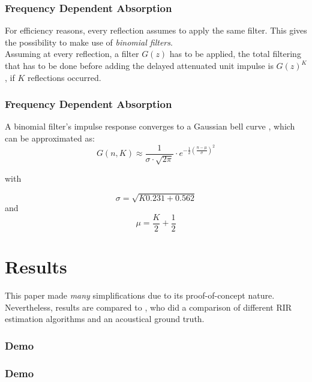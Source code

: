 \documentclass[aspectratio=169]{beamer}
\begin{document}
\begin{frame}
\frametitle{Frequency Dependent Absorption}
For efficiency reasons, every reflection assumes to apply the same filter. This gives the possibility to make use of \textit{binomial filters}. \\
Assuming at every reflection, a filter $G(z)$ has to be applied, the total filtering that has to be done before adding the delayed attenuated unit impulse is $G(z)^K$, if $K$ reflections occurred.


\end{frame}

\begin{frame}
\frametitle{Frequency Dependent Absorption}
A binomial filter's impulse response converges to a Gaussian bell curve \cite{aubury_binomial_1996}, which can be approximated as:
\begin{equation}
G(n,K) \approx  \frac{1}{\sigma \cdot \sqrt{2 \pi}} \cdot e ^{-\frac{1}{2} (\frac{n-\mu}{\sigma})^2}
\label{eq:assump}
\end{equation}


with 

\begin{equation}
\sigma = \sqrt{K 0.231 + 0.562}
\end{equation}
and 
\begin{equation}
\mu = \frac{K}{2} + \frac{1}{2}
\end{equation}

\end{frame}


\section{Results}
\begin{frame}
This paper made \textit{many} simplifications due to its proof-of-concept nature. Nevertheless, results are compared to \cite{brinkmann_round_2019}, who did a comparison of different RIR estimation algorithms and an acoustical ground truth\cite{Aspoeck}.
\end{frame}


\begin{frame}
\frametitle{Demo}
\end{frame}


\begin{frame}
\frametitle{Demo}
\end{frame}
\end{document}
